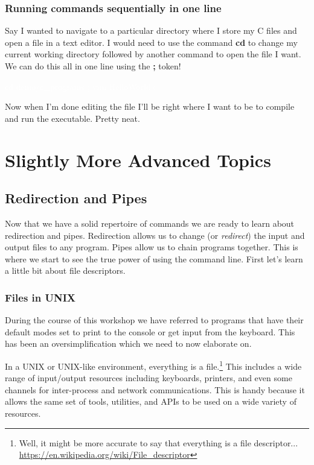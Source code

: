 \documentclass[oneside]{book}
\newcommand{\commandline}[1]{\begin{center} \colorbox{Dark}{\textcolor{white}{#1}} \end{center}}
\begin{document}
\subsection{Running commands sequentially in one line}
Say I wanted to navigate to a particular directory where I store my C files and open a file in a text editor. I would need to use the command \textbf{cd} to change my current working directory followed by another command to open the file I want. We can do this all in one line using the \textbf{;} token!
\commandline{cd demo/c\_programs ; vim HelloWorld.c}

Now when I'm done editing the file I'll be right where I want to be to compile and run the executable. Pretty neat.



\newpage

\chapter{Slightly More Advanced Topics}

\section{Redirection and Pipes}
    Now that we have a solid repertoire of commands we are ready to learn about redirection and pipes. Redirection allows us to change (or \textit{redirect}) the input and output files to any program. Pipes allow us to chain programs together. This is where we start to see the true power of using the command line. First let's learn a little bit about file descriptors. 
    
    \subsection{Files in UNIX}
    During the course of this workshop we have referred to programs that have their default modes set to print to the console or get input from the keyboard. This has been an oversimplification which we need to now elaborate on.
        
    In a UNIX or UNIX-like environment, everything is a file.\footnote{Well, it might be more accurate to say that everything is a file descriptor... \url{https://en.wikipedia.org/wiki/File_descriptor}} This includes a wide range of input/output resources including keyboards, printers, and even some channels for inter-process and network communications. This is handy because it allows the same set of tools, utilities, and APIs to be used on a wide variety of resources.
    
\end{document}
